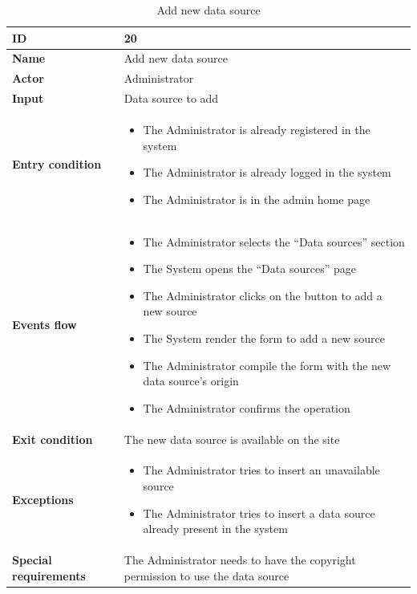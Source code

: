 \begin{longtable}{p{} | p{}}
    \caption{Add new data source}
        \label{tab:add_new_data_source}\\
        \hline
        \textbf{ID} & 20\\
        \hline
        \textbf{Name}  &  Add new data source \\
        \hline
        \textbf{Actor}  &  Administrator\\
        \hline
        \textbf{Input}  &  Data source to add\\
        \hline
        \textbf{Entry condition}  &  
        \begin{itemize}
                \item The Administrator is already registered in the system
                \item The Administrator is already logged in the system
                \item The Administrator is in the admin home page
         \end{itemize}\\
        \hline
        \textbf{Events flow} & 
        \begin{itemize}
                \item The Administrator selects the “Data sources” section
                \item The System opens the “Data sources” page
                \item The Administrator clicks on the button to add a new source
                \item The System render the form to add a new source
                \item The Administrator compile the form with the new data source’s origin
                \item The Administrator confirms the operation 
                 \end{itemize}
                 \\
        \hline
        \textbf{Exit condition} & The new data source is available on the site\\
        \hline
        \textbf{Exceptions} & 
        \begin{itemize}
                \item The Administrator tries to insert an unavailable source
                \item The Administrator tries to insert a data source already present in the system
                \end{itemize}
                \\
        \hline
        \textbf{Special requirements}  &  The Administrator needs to have the copyright permission to use the data source\\
        \hline
       
        
    \end{longtable}
    
